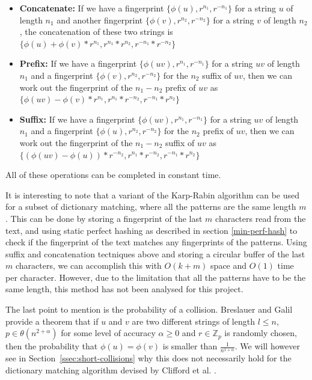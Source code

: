 \documentclass[ %
                    author={Dominic Joseph Moylett},
                    degree={MEng},
                     title={Dictionary Matching with Fingerprints},
                  subtitle={An Empirical Analysis},
                      type={Research},
                      year={2014} ]{dissertation}
\begin{document}
\begin{itemize}
  \item \textbf{Concatenate:} If we have a fingerprint $\{\phi(u), r^{n_1}, r^{-n_1}\}$ for a string $u$ of length $n_1$ and another fingerprint $\{\phi(v), r^{n_2}, r^{-n_2}\}$ for a string $v$ of length $n_2$, the concatenation of these two strings is $\{\phi(u) + \phi(v)*r^{n_1}, r^{n_1} * r^{n_2}, r^{-n_1} * r^{-n_2}\}$
  \item \textbf{Prefix:} If we have a fingerprint $\{\phi(uv), r^{n_1}, r^{-n_1}\}$ for a string $uv$ of length $n_1$ and a fingerprint $\{\phi(v), r^{n_2}, r^{-n_2}\}$ for the $n_2$ suffix of $uv$, then we can work out the fingerprint of the $n_1 - n_2$ prefix of $uv$ as $\{\phi(uv) - \phi(v)*r^{n_1}, r^{n_1} * r^{-n_2}, r^{-n_1} * r^{n_2}\}$
  \item \textbf{Suffix:} If we have a fingerprint $\{\phi(uv), r^{n_1}, r^{-n_1}\}$ for a string $uv$ of length $n_1$ and a fingerprint $\{\phi(u), r^{n_2}, r^{-n_2}\}$ for the $n_2$ prefix of $uv$, then we can work out the fingerprint of the $n_1 - n_2$ suffix of $uv$ as $\{(\phi(uv) - \phi(u))*r^{-n_2}, r^{n_1} * r^{-n_2}, r^{-n_1} * r^{n_2}\}$
\end{itemize}

All of these operations can be completed in constant time.

It is interesting to note that a variant of the Karp-Rabin algorithm can be used for a subset of dictionary matching, where all the patterns are the same length $m$\cite{candan:data}. This can be done by storing a fingerprint of the last $m$ characters read from the text, and using static perfect hashing as described in section \ref{min-perf-hash} to check if the fingerprint of the text matches any fingerprints of the patterns. Using suffix and concatenation tectniques above and storing a circular buffer of the last $m$ characters, we can accomplish this with $O(k + m)$ space and $O(1)$ time per character. However, due to the limitation that all the patterns have to be the same length, this method has not been analysed for this project.

The last point to mention is the probability of a collision. Breslauer and Galil\cite{Breslauer:2014:RSS:2660854.2635814} provide a theorem that if $u$ and $v$ are two different strings of length $l \leq n$, $p \in \theta(n^{2 + \alpha})$ for some level of accuracy $\alpha \geq 0$ and $r \in \mathbb{Z}_p$ is randomly chosen, then the probability that $\phi(u) = \phi(v)$ is smaller than $\frac{1}{n^{1 + \alpha}}$. We will however see in Section~\ref{ssec:short-collisions} why this does not necessarily hold for the dictionary matching algorithm devised by Clifford et al. \cite{clifford:dict-matching}.
\end{document}
